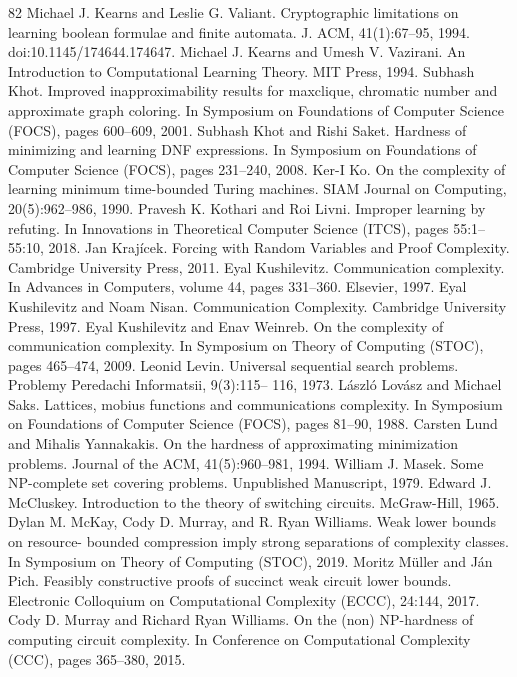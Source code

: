\begin{thebibliography}{82}
Michael J. Kearns and Leslie G. Valiant. Cryptographic limitations on learning boolean formulae and finite automata. J. ACM, 41(1):67–95, 1994. doi:10.1145/174644.174647.
Michael J. Kearns and Umesh V. Vazirani. An Introduction to Computational Learning Theory. MIT Press, 1994.
Subhash Khot. Improved inapproximability results for maxclique, chromatic number and approximate graph coloring. In Symposium on Foundations of Computer Science (FOCS), pages 600–609, 2001.
Subhash Khot and Rishi Saket. Hardness of minimizing and learning DNF expressions. In Symposium on Foundations of Computer Science (FOCS), pages 231–240, 2008.
Ker-I Ko. On the complexity of learning minimum time-bounded Turing machines. SIAM Journal on Computing, 20(5):962–986, 1990.
Pravesh K. Kothari and Roi Livni. Improper learning by refuting. In Innovations in Theoretical Computer Science (ITCS), pages 55:1–55:10, 2018.
Jan Krajícek. Forcing with Random Variables and Proof Complexity. Cambridge University Press, 2011.
Eyal Kushilevitz. Communication complexity. In Advances in Computers, volume 44, pages 331–360. Elsevier, 1997.
Eyal Kushilevitz and Noam Nisan. Communication Complexity. Cambridge University Press, 1997.
Eyal Kushilevitz and Enav Weinreb. On the complexity of communication complexity. In Symposium on Theory of Computing (STOC), pages 465–474, 2009.
Leonid Levin. Universal sequential search problems. Problemy Peredachi Informatsii, 9(3):115– 116, 1973.
László Lovász and Michael Saks. Lattices, mobius functions and communications complexity. In Symposium on Foundations of Computer Science (FOCS), pages 81–90, 1988.
Carsten Lund and Mihalis Yannakakis. On the hardness of approximating minimization problems. Journal of the ACM, 41(5):960–981, 1994.
William J. Masek. Some NP-complete set covering problems. Unpublished Manuscript, 1979.
Edward J. McCluskey. Introduction to the theory of switching circuits. McGraw-Hill, 1965.
Dylan M. McKay, Cody D. Murray, and R. Ryan Williams. Weak lower bounds on resource- bounded compression imply strong separations of complexity classes. In Symposium on Theory of Computing (STOC), 2019.
Moritz Müller and Ján Pich. Feasibly constructive proofs of succinct weak circuit lower bounds. Electronic Colloquium on Computational Complexity (ECCC), 24:144, 2017.
Cody D. Murray and Richard Ryan Williams. On the (non) NP-hardness of computing circuit complexity. In Conference on Computational Complexity (CCC), pages 365–380, 2015.

\end{thebibliography}
